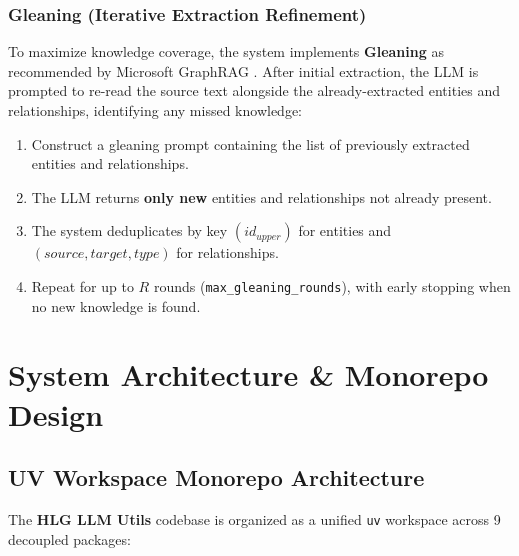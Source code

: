 \documentclass[11pt,a4paper]{report}
\begin{document}
\subsection{Gleaning (Iterative Extraction Refinement)}
To maximize knowledge coverage, the system implements \textbf{Gleaning} as recommended by Microsoft GraphRAG \cite{edge2024graphrag}. After initial extraction, the LLM is prompted to re-read the source text alongside the already-extracted entities and relationships, identifying any missed knowledge:
\begin{enumerate}
    \item Construct a gleaning prompt containing the list of previously extracted entities and relationships.
    \item The LLM returns \textbf{only new} entities and relationships not already present.
    \item The system deduplicates by key $(id_{upper})$ for entities and $(source, target, type)$ for relationships.
    \item Repeat for up to $R$ rounds (\texttt{max\_gleaning\_rounds}), with early stopping when no new knowledge is found.
\end{enumerate}

\chapter{System Architecture \& Monorepo Design}

\section{UV Workspace Monorepo Architecture}
The \textbf{HLG LLM Utils} codebase is organized as a unified \texttt{uv} workspace across 9 decoupled packages:
\end{document}
